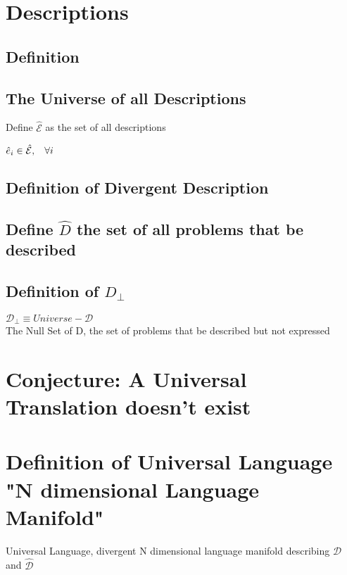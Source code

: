 \documentclass[11pt]{article}
\begin{document}
\section{Descriptions}
\subsection{Definition}


\subsection{The Universe of all Descriptions}
Define $\hat{\mathcal{E}}$ as the set of all descriptions
\begin{center}
$
\hat{e}_i \in \hat{\mathcal{E}}, \hspace{3mm} \forall i
$
\end{center}

\subsection{Definition of Divergent Description}

\subsection{Define $\hat{D}$ the set of all problems that be described}

\subsection{Definition of $D_\perp$}
$\mathcal{D_\perp} \equiv Universe - \mathcal{D}$
\\The Null Set of D, the set of problems that be described but not expressed










\section{Conjecture: A Universal Translation doesn't exist}









\section{Definition of Universal Language\\ "N dimensional Language Manifold"}
Universal Language, divergent N dimensional language manifold describing $\mathcal{D}$  and $\hat{\mathcal{D}}$
\end{document}
